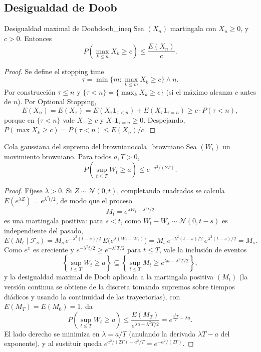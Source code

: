 \documentclass[11pt, a4paper]{article}
\begin{document}
\subsection{Desigualdad de Doob}

\begin{teorema}{Desigualdad maximal de Doob}{doob_ineq}
Sea $(X_n)$ martingala con $X_n \ge 0$, y $c > 0$. Entonces
$$ P\left(\max_{k \le n} X_k \ge c\right) \le \frac{E(X_n)}{c}. $$
\end{teorema}

\begin{proof}
Se define el stopping time
$$ \tau = \min\{m : \max_{k \le m} X_k \ge c\} \wedge n. $$
Por construcción $\tau \le n$ y $\{\tau < n\} = \{\max_k X_k \ge c\}$ (si el máximo alcanza $c$
antes de $n$). Por Optional Stopping,
$$ E(X_n) = E(X_\tau) = E(X_\tau \mathbf{1}_{\tau < n}) + E(X_\tau \mathbf{1}_{\tau = n})
\ge c \cdot P(\tau < n), $$
porque en $\{\tau < n\}$ vale $X_\tau \ge c$ y $X_\tau \mathbf{1}_{\tau = n} \ge 0$. Despejando,
$P(\max X_k \ge c) = P(\tau < n) \le E(X_n)/c$.
\end{proof}

\begin{corolario}{Cola gaussiana del supremo del browniano}{cola_browniano}
Sea $(W_t)$ un movimiento browniano. Para todos $a, T > 0$,
$$ P\!\left(\sup_{t \le T} W_t \ge a\right) \le e^{-a^2/(2T)}. $$
\end{corolario}

\begin{proof}
Fíjese $\lambda > 0$. Si $Z \sim \mathcal{N}(0, t)$, completando cuadrados se calcula
$E(e^{\lambda Z}) = e^{\lambda^2 t/2}$, de modo que el proceso
$$ M_t = e^{\lambda W_t - \lambda^2 t / 2} $$
es una martingala positiva: para $s < t$, como $W_t - W_s \sim \mathcal{N}(0, t - s)$ es
independiente del pasado,
$$ E(M_t \mid \mathcal{F}_s) = M_s \, e^{-\lambda^2 (t - s)/2} \, E\big(e^{\lambda (W_t -
W_s)}\big) = M_s \, e^{-\lambda^2 (t-s)/2} \, e^{\lambda^2 (t-s)/2} = M_s. $$
Como $e^x$ es creciente y $e^{-\lambda^2 t/2} \ge e^{-\lambda^2 T/2}$ para $t \le T$, vale la
inclusión de eventos
$$ \left\{ \sup_{t \le T} W_t \ge a \right\} \subseteq \left\{ \sup_{t \le T} M_t \ge
e^{\lambda a - \lambda^2 T/2} \right\}, $$
y la desigualdad maximal de Doob aplicada a la martingala positiva $(M_t)$ (la versión
continua se obtiene de la discreta tomando supremos sobre tiempos diádicos y usando la
continuidad de las trayectorias), con $E(M_T) = E(M_0) = 1$, da
$$ P\!\left(\sup_{t \le T} W_t \ge a\right) \le \frac{E(M_T)}{e^{\lambda a - \lambda^2 T/2}} =
e^{\frac{\lambda^2 T}{2} - \lambda a}. $$
El lado derecho se minimiza en $\lambda = a/T$ (anulando la derivada $\lambda T - a$ del
exponente), y al sustituir queda $e^{a^2/(2T) - a^2/T} = e^{-a^2/(2T)}$.
\end{proof}
\end{document}
